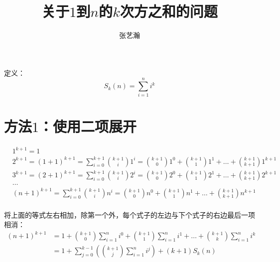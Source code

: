 \documentclass{article}
\begin{document}
\begin{CJK*}{UTF8}{gbsn}

\newcommand \fallingfactorialpower[2]{{#1}^{\underline{#2}}}
\newcommand \columnvector[2]{
	\left(
	\begin{array}{c}
	{#1}_1 \\ {#1}_2 \\ \vdots \\ {#1}_{#2}
	\end{array}
	\right)
}
\newcommand \rowvector[2]{
	\left(
	\begin{array}{cccc}
	{#1}_1 & {#1}_2 & \ldots & {#1}_{#2}
	\end{array}
	\right)
}

\title{关于$1$到$n$的$k$次方之和的问题}
\author{张艺瀚}
\date{}
\maketitle

定义：
\[
S_k(n) = \sum_{i = 1}^n i^k
\]

\section{方法$1$：使用二项展开}

\[
\begin{aligned}
& 1^{k + 1} = 1 \\
& 2^{k + 1} = (1 + 1)^{k + 1} = \sum_{i = 0}^{k + 1} \binom {k + 1} i 1^i = \binom {k + 1} 0 1^0 + \binom {k + 1} 1 1^1 + \ldots + \binom {k + 1} {k + 1} 1^{k + 1} \\
& 3^{k + 1} = (2 + 1)^{k + 1} = \sum_{i = 0}^{k + 1} \binom {k + 1} i 2^i = \binom {k + 1} 0 2^0 + \binom {k + 1} 1 2^1 + \ldots + \binom {k + 1} {k + 1} 2^{k + 1} \\
& \ldots \\
& (n + 1)^{k + 1} = \sum_{i = 0}^{k + 1} \binom {k + 1} i n^i = \binom {k + 1} 0 n^0 + \binom {k + 1} 1 n^1 + \ldots + \binom {k + 1} {k + 1} n^{k + 1} \\
\end{aligned}
\]

将上面的等式左右相加，除第一个外，每个式子的左边与下个式子的右边最后一项相消：
\[
\begin{aligned}
(n + 1)^{k + 1}	& = 1 + \binom {k + 1} 0 \sum_{i = 1}^n i^0 + \binom {k + 1} 1 \sum_{i = 1}^n i^1 + \ldots + \binom {k + 1} k \sum_{i = 1}^n i^k \\
				& = 1 + \sum_{j = 0}^{k - 1} \left( \binom {k + 1} j \sum_{i = 1}^n i^j \right) + (k + 1)S_k(n) \\
\end{aligned}
\]


\end{CJK*}
\end{document}
